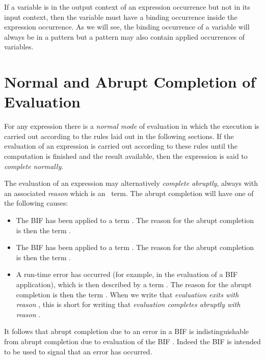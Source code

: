 If a variable is in the output context of an expression occurrence but
not in its input context, then the variable must have a binding
occurrence inside the expression occurrence.  As we will see, the
binding occurrence of a variable will always be in a pattern but a
pattern may also contain applied occurrences of variables.
\fi
{}

\section{Normal and Abrupt Completion of Evaluation}

\label{section:completion}

For any expression there is a \emph{normal mode} of
evaluation in which the execution is
carried out according to the rules laid out in the following sections.
If the evaluation of an expression is carried out according to these
rules until the computation is finished and the result available, then
the expression is said to \emph{complete
normally}.

The evaluation of an expression may alternatively \emph{complete
abruptly}, always with an associated
\emph{reason} which is an
\Erlang\ term.  The abrupt completion will have one of the following
causes:
\begin{itemize}
\item The BIF  has been applied to a term .
The reason for the abrupt completion is then the term
.

\item The BIF  has been applied
to a term .  The reason for the abrupt completion is then the
term .

\item A run-time error has occurred (for example, in
the evaluation of a BIF application), which is then described by a
term .
The reason for the abrupt completion is then the term .
When we write that \emph{evaluation exits with reason} , this is
short for writing that \emph{evaluation completes abruptly with reason}
.
\end{itemize}
It follows that abrupt completion due to an error in a BIF is
indistinguishable from abrupt completion due to evaluation of the BIF
.  Indeed the BIF  is intended to be used to
signal that an error has occurred.

